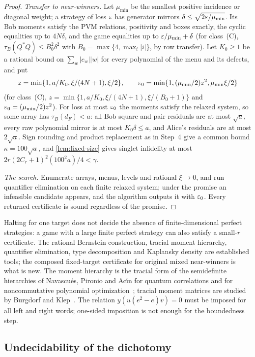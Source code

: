 \begin{proof}
\emph{Transfer to near-winners.} Let $\mu_{\min}$ be the smallest positive incidence or diagonal weight; a strategy of
loss $\varepsilon$ has generator mirrors $\delta\le\sqrt{2\varepsilon/\mu_{\min}}$. Its Bob moments satisfy the PVM relations, positivity
and boxes exactly, the cyclic equalities up to $4N\delta$, and the game equalities up to $\varepsilon/\mu_{\min}+\delta$ (for
class~(C), $\tau_B(Q^*Q)\le B_0^2\delta^2$ with $B_0=\max\{4,\max_i|i|\}$, by row transfer). Let $K_0\ge1$ be a rational bound on
$\sum_w|c_w||w|$ for every polynomial of the menu and its defects, and put
\[
z=\min\{1,a/K_0,\xi/(4N+1),\xi/2\},\qquad\varepsilon_0=\min\{1,(\mu_{\min}/2)z^2,\mu_{\min}\xi/2\}
\]
(for class~(C), $z=\min\{1,a/K_0,\xi/(4N+1),\xi/(B_0+1)\}$ and $\varepsilon_0=(\mu_{\min}/2)z^2$). For loss at most $\varepsilon_0$ the
moments satisfy the relaxed system, so some array has $\tau_B(d_F)<a$: all Bob square and pair residuals are at most
$\sqrt a$, every raw polynomial mirror is at most $K_0\delta\le a$, and Alice's residuals are at most $2\sqrt a$. Sign
rounding and product replacement as in Step~4 give a common bound $\kappa=100\sqrt a$, and \cref{lem:fixed-size} gives
singlet infidelity at most $2r(2C_r+1)^2(100^2a)/4<\gamma$.

\emph{The search.} Enumerate arrays, menus, levels and rational $\xi\to0$, and run quantifier elimination on each finite
relaxed system; under the promise an infeasible candidate appears, and the algorithm outputs it with $\varepsilon_0$. Every
returned certificate is sound regardless of the promise.
\end{proof}

Halting for one target does not decide the absence of finite-dimensional perfect strategies: a game with a large finite
perfect strategy can also satisfy a small-$r$ certificate. The rational Bernstein construction, tracial moment hierarchy,
quantifier elimination, type decomposition and Kaplansky density are established tools; the composed fixed-target
certificate for original mixed near-winners is what is new. The moment hierarchy is the tracial form of the semidefinite
hierarchies of Navascu\'es, Pironio and Ac\'{\i}n for quantum correlations and for noncommutative polynomial
optimization~\cite{NPA08,PNA10}; tracial moment matrices are studied by Burgdorf and Klep~\cite{BuKl12}. The relation
$y(u(e^2-e)v)=0$ must be imposed for all left and right words; one-sided imposition is not enough for the boundedness step.

\subsection{Undecidability of the dichotomy}\label{sec:undecidable}

